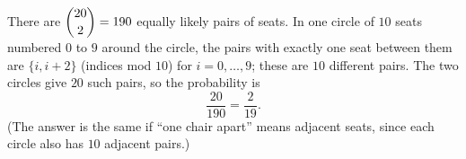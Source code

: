 There are $\dbinom{20}{2}=190$ equally likely pairs of seats. In one circle of $10$ seats numbered $0$ to $9$ around the circle, the pairs with exactly one seat between them are $\{i,i+2\}$ (indices mod $10$) for $i=0,\dots,9$; these are $10$ different pairs. The two circles give $20$ such pairs, so the probability is
\[\dfrac{20}{190}=\boxed{\dfrac{2}{19}}.\]
(The answer is the same if ``one chair apart'' means adjacent seats, since each circle also has $10$ adjacent pairs.)
